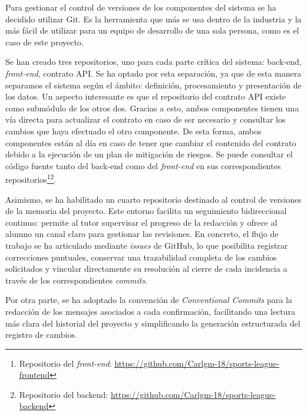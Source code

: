 Para gestionar el control de versiones de los componentes del sistema se ha decidido utilizar Git. Es la herramienta que más se usa dentro de la industria y la más fácil de utilizar para un equipo de desarrollo de una sola persona, como es el caso de este proyecto.

Se han creado tres repositorios, uno para cada parte crítica del sistema: back-end, \emph{front-end}, contrato API. Se ha optado por esta separación, ya que de esta manera separamos el sistema según el ámbito: definición, procesamiento y presentación de los datos. Un aspecto interesante es que el repositorio del contrato API existe como submódulo de los otros dos. Gracias a esto, ambos componentes tienen una vía directa para actualizar el contrato en caso de ser necesario y consultar los cambios que haya efectuado el otro componente. De esta forma, ambos componentes están al día en caso de tener que cambiar el contenido del contrato debido a la ejecución de un plan de mitigación de riesgos. Se puede consultar el código fuente tanto del back-end como del \emph{front-end} en sus correspondientes repositorios\footnote{Repositorio del \emph{front-end}: \url{https://github.com/Carlgm-18/sports-league-frontend}}\footnote{Repositorio del backend: \url{https://github.com/Carlgm-18/sports-league-backend}}.

Asimismo, se ha habilitado un cuarto repositorio destinado al control de versiones de la memoria del proyecto. Este entorno facilita un seguimiento bidireccional continuo: permite al tutor supervisar el progreso de la redacción y ofrece al alumno un canal claro para gestionar las revisiones. En concreto, el flujo de trabajo se ha articulado mediante \emph{issues} de GitHub, lo que posibilita registrar correcciones puntuales, conservar una trazabilidad completa de los cambios solicitados y vincular directamente su resolución al cierre de cada incidencia a través de los correspondientes \emph{commits}.

Por otra parte, se ha adoptado la convención de \emph{Conventional Commits} para la redacción de los mensajes asociados a cada confirmación, facilitando una lectura más clara del historial del proyecto y simplificando la generación estructurada del registro de cambios.
